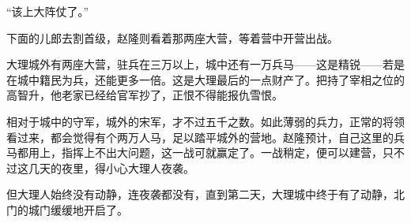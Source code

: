 “该上大阵仗了。”

下面的儿郎去割首级，赵隆则看着那两座大营，等着营中开营出战。

大理城外有两座大营，驻兵在三万以上，城中还有一万兵马——这是精锐——若是在城中籍民为兵，还能更多一倍。这是大理最后的一点财产了。把持了宰相之位的高智升，他老家已经给官军抄了，正恨不得能报仇雪恨。

相对于城中的守军，城外的宋军，才不过五千之数。如此薄弱的兵力，正常的将领看过来，都会觉得有个两万人马，足以踏平城外的营地。赵隆预计，自己这里的兵马都用上，指挥上不出大问题，这一战可就赢定了。一战稍定，便可以建营，只不过这几天的夜里，得小心大理人夜袭。

但大理人始终没有动静，连夜袭都没有，直到第二天，大理城中终于有了动静，北门的城门缓缓地开启了。
